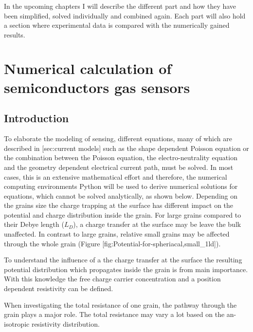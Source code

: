 \documentclass[11pt]{article}
\begin{document}
In the upcoming chapters I will describe the different part and how they
have been simplified, solved individually and combined again. Each part
will also hold a section where experimental data is compared with the
numerically gained results.

    \hypertarget{numerical-calculation-of-semiconductors-gas-sensors}{%
\section{Numerical calculation of semiconductors gas
sensors}\label{numerical-calculation-of-semiconductors-gas-sensors}}

    \hypertarget{introduction}{%
\subsection{Introduction}\label{introduction}}

To elaborate the modeling of sensing, different equations, many of which
are described in {[}sec:current models{]} such as the shape dependent
Poisson equation or the combination between the Poisson equation, the
electro-neutrality equation and the geometry dependent electrical
current path, must be solved. In most cases, this is an extensive
mathematical effort and therefore, the numerical computing environments
Python will be used to derive numerical solutions for equations, which
cannot be solved analytically, as shown below. Depending on the grains
size the charge trapping at the surface has different impact on the
potential and charge distribution inside the grain. For large grains
compared to their Debye length (\(L_D\)), a charge transfer at the
surface may be leave the bulk unaffected. In contrast to large grains,
relative small grains may be affected through the whole grain (Figure
{[}fig:Potential-for-spheriacal,small\_1ld{]}).

To understand the influence of a the charge transfer at the surface the
resulting potential distribution which propagates inside the grain is
from main importance. With this knowledge the free charge carrier
concentration and a position dependent resistivity can be defined.

When investigating the total resistance of one grain, the pathway
through the grain plays a major role. The total resistance may vary a
lot based on the an-isotropic resistivity distribution.
\end{document}
